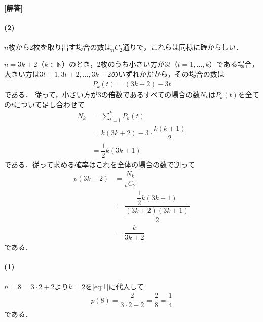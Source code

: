 \documentclass[../../main.tex]{subfiles}
\begin{document}
\begin{oframed}
  
\end{oframed}

{\bf [解答]}

\paragraph{(2)}
$n$枚から2枚を取り出す場合の数は${}_nC_{2}$通りで，これらは同様に確からしい．

$n=3k+2$（$k\in\mathbb N$）のとき，2枚のうち小さい方が$3t$（$t=1,\dots,k$）である場合，大きい方は$3t+1,3t+2,\dots,3k+2$のいずれかだから，その場合の数は
\begin{align}
  P_k(t)=(3k+2)-3t
\end{align}
である．
従って，小さい方が3の倍数であるすべての場合の数$N_k$は$P_k(t)$を全ての$t$について足し合わせて
\begin{align}
  N_k
  &=\sum_{t=1}^kP_k(t) \\
  &=k(3k+2)-3\cdot\dfrac{k(k+1)}{2} \\
  &=\dfrac{1}{2}k(3k+1)
\end{align}
である．従って求める確率はこれを全体の場合の数で割って
\begin{align}
  p(3k+2)
  &=\dfrac{N_k}{{}_{n}C_{2}} \\
  &=\dfrac{\dfrac{1}{2}k(3k+1)}{\dfrac{(3k+2)(3k+1)}{2}} \\
  &=\dfrac{k}{3k+2} \label{eq:1}
\end{align}
である．

\paragraph{(1)}

$n=8=3\cdot2+2$より$k=2$を\cref{eq:1}に代入して
\begin{align}
  p(8)=\dfrac{2}{3\cdot2+2}=\dfrac{2}{8}=\dfrac{1}{4}
\end{align}
である．

\newpage
\end{document}
